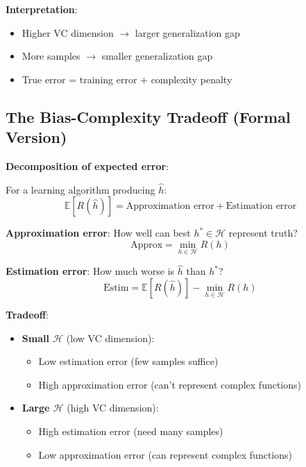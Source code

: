 \textbf{Interpretation}:
\begin{itemize}
    \item Higher VC dimension $\rightarrow$ larger generalization gap
    \item More samples $\rightarrow$ smaller generalization gap
    \item True error = training error + complexity penalty
\end{itemize}

\subsection{The Bias-Complexity Tradeoff (Formal Version)}

\textbf{Decomposition of expected error}:

For a learning algorithm producing $\hat{h}$:
\begin{equation}
\mathbb{E}[R(\hat{h})] = \text{Approximation error} + \text{Estimation error}
\end{equation}

\textbf{Approximation error}: How well can best $h^* \in \mathcal{H}$ represent truth?
\begin{equation}
\text{Approx} = \min_{h\in\mathcal{H}} R(h)
\end{equation}

\textbf{Estimation error}: How much worse is $\hat{h}$ than $h^*$?
\begin{equation}
\text{Estim} = \mathbb{E}[R(\hat{h})] - \min_{h\in\mathcal{H}} R(h)
\end{equation}

\textbf{Tradeoff}:
\begin{itemize}
    \item \textbf{Small $\mathcal{H}$} (low VC dimension):
    \begin{itemize}
        \item Low estimation error (few samples suffice)
        \item High approximation error (can't represent complex functions)
    \end{itemize}

    \item \textbf{Large $\mathcal{H}$} (high VC dimension):
    \begin{itemize}
        \item High estimation error (need many samples)
        \item Low approximation error (can represent complex functions)
    \end{itemize}
\end{itemize}

